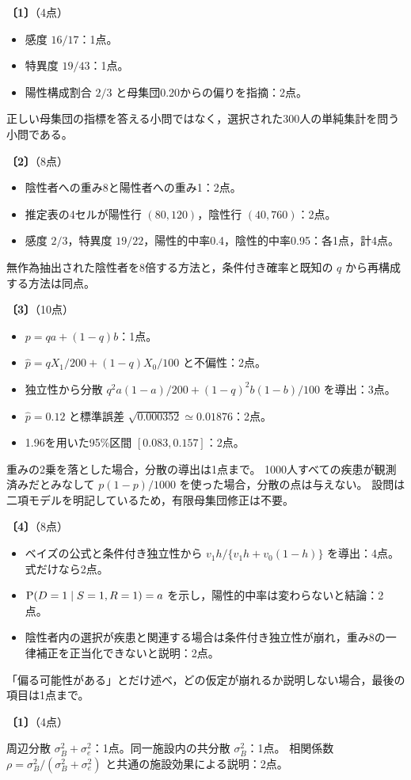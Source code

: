 \documentclass[a4paper,11pt]{ltjsarticle}
\renewcommand{\ans}[1]{\par\medskip\noindent\textbf{〔#1〕}\quad}
\renewcommand{\points}[1]{\hfill\textnormal{（#1点）}\par\nobreak}
\begin{document}
\ans{1}\points{4}
\begin{itemize}
\item 感度 $16/17$：1点。
\item 特異度 $19/43$：1点。
\item 陽性構成割合 $2/3$ と母集団0.20からの偏りを指摘：2点。
\end{itemize}
正しい母集団の指標を答える小問ではなく，選択された300人の単純集計を問う小問である。

\ans{2}\points{8}
\begin{itemize}
\item 陰性者への重み8と陽性者への重み1：2点。
\item 推定表の4セルが陽性行 $(80,120)$，陰性行 $(40,760)$：2点。
\item 感度 $2/3$，特異度 $19/22$，陽性的中率0.4，陰性的中率0.95：各1点，計4点。
\end{itemize}
無作為抽出された陰性者を8倍する方法と，条件付き確率と既知の $q$ から再構成する方法は同点。

\ans{3}\points{10}
\begin{itemize}
\item $p=qa+(1-q)b$：1点。
\item $\hat p=qX_1/200+(1-q)X_0/100$ と不偏性：2点。
\item 独立性から分散 $q^2a(1-a)/200+(1-q)^2b(1-b)/100$ を導出：3点。
\item $\hat p=0.12$ と標準誤差 $\sqrt{0.000352}\simeq0.01876$：2点。
\item 1.96を用いた95\%区間 $[0.083,0.157]$：2点。
\end{itemize}
重みの2乗を落とした場合，分散の導出は1点まで。
1000人すべての疾患が観測済みだとみなして $p(1-p)/1000$ を使った場合，分散の点は与えない。
設問は二項モデルを明記しているため，有限母集団修正は不要。

\ans{4}\points{8}
\begin{itemize}
\item ベイズの公式と条件付き独立性から $v_1h/\{v_1h+v_0(1-h)\}$ を導出：4点。式だけなら2点。
\item $\operatorname{P}(D=1\mid S=1,R=1)=a$ を示し，陽性的中率は変わらないと結論：2点。
\item 陰性者内の選択が疾患と関連する場合は条件付き独立性が崩れ，重み8の一律補正を正当化できないと説明：2点。
\end{itemize}
「偏る可能性がある」とだけ述べ，どの仮定が崩れるか説明しない場合，最後の項目は1点まで。
\newpage

\ans{1}\points{4}
周辺分散 $\sigma_B^2+\sigma_e^2$：1点。同一施設内の共分散 $\sigma_B^2$：1点。
相関係数 $\rho=\sigma_B^2/(\sigma_B^2+\sigma_e^2)$ と共通の施設効果による説明：2点。
\end{document}
